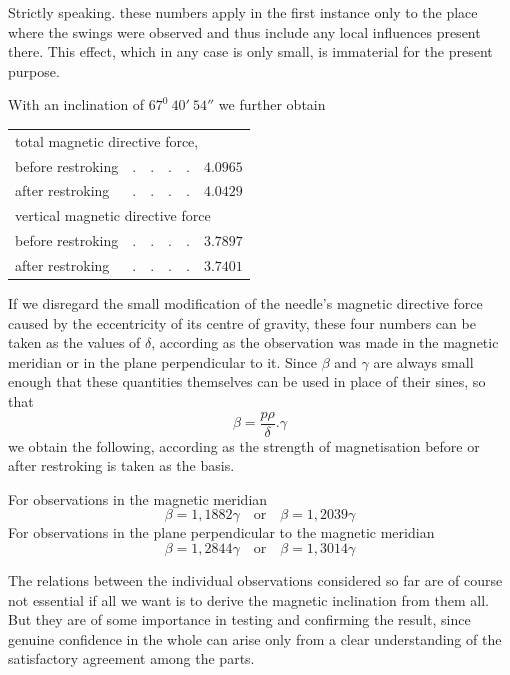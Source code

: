 Strictly speaking. these numbers apply in the first instance only to the place where the swings were observed and thus include any local influences present there. This effect, which in any case is only small, is immaterial for the present purpose.

With an inclination of $67^0\ 40'\ 54''$ we further obtain
\begin{center}
\begin{tabular}{llr}
\multicolumn{3}{l}{total magnetic directive force,}\\
\quad before restroking&$.\quad.\quad.\quad.$&$4.0965$\\
\quad after restroking&$.\quad.\quad.\quad.$&$4.0429$\\
\multicolumn{3}{l}{vertical magnetic directive force}\\
\quad before restroking&$.\quad.\quad.\quad.$&$3.7897$\\
\quad after restroking&$.\quad.\quad.\quad.$&$3.7401$
\end{tabular}
\end{center}

If we disregard the small modification of the needle's magnetic directive force caused by the eccentricity of its centre of gravity, these four numbers can be taken as the values of $\delta$, according as the observation was made in the magnetic meridian or in the plane perpendicular to it. Since $\beta$ and $\gamma$ are always small enough that these quantities themselves can be used in place of their sines, so that
\[
\beta=\frac{p\rho}{\delta}.\gamma
\]
we obtain the following, according as the strength of magnetisation before or after restroking is taken as the basis.

For observations in the magnetic meridian
\[
\beta=1{,}1882\gamma\quad\text{or}\quad\beta=1{,}2039\gamma
\]
For observations in the plane perpendicular to the magnetic meridian
\[
\beta=1{,}2844\gamma\quad\text{or}\quad\beta=1{,}3014\gamma
\]


The relations between the individual observations considered so far are of course not essential if all we want is to derive the magnetic inclination from them all. But they are of some importance in testing and confirming the result, since genuine confidence in the whole can arise only from a clear understanding of the satisfactory agreement among the parts.

